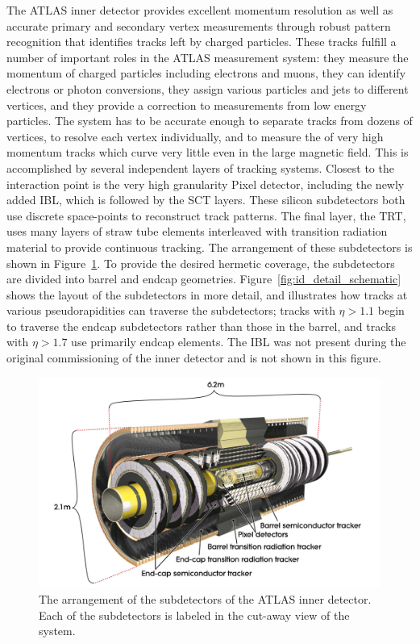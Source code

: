 The ATLAS inner detector provides excellent momentum resolution as well as accurate primary and secondary vertex measurements through robust pattern recognition that identifies tracks left by charged particles. 
These tracks fulfill a number of important roles in the ATLAS measurement system: they measure the momentum of charged particles including electrons and muons, they can identify electrons or photon conversions, they assign various particles and jets to different vertices, and they provide a correction to \met measurements from low energy particles. 
The system has to be accurate enough to separate tracks from dozens of vertices, to resolve each vertex individually, and to measure the \pt of very high momentum tracks which curve very little even in the large magnetic field.
This is accomplished by several independent layers of tracking systems.
Closest to the interaction point is the very high granularity Pixel detector, including the newly added \acl{IBL}, which is followed by the \ac{SCT} layers.
These silicon subdetectors both use discrete space-points to reconstruct track patterns.
The final layer, the \ac{TRT}, uses many layers of straw tube elements interleaved with transition radiation material to provide continuous tracking.
The arrangement of these subdetectors is shown in Figure~\ref{fig:id_overview}.
To provide the desired hermetic coverage, the subdetectors are divided into barrel and endcap geometries.
Figure~\ref{fig:id_detail_schematic} shows the layout of the subdetectors in more detail, and illustrates how tracks at various pseudorapidities can traverse the subdetectors; tracks with $\eta > 1.1$ begin to traverse the endcap subdetectors rather than those in the barrel, and tracks with $\eta > 1.7$ use primarily endcap elements. 
The \ac{IBL} was not present during the original commissioning of the inner detector and is not shown in this figure.

\begin{figure}[hbtp]
\includegraphics[width=\fullfig]{figures/id_overview.pdf}
\caption{The arrangement of the subdetectors of the ATLAS inner detector. Each of the subdetectors is labeled in the cut-away view of the system.}
\label{fig:id_overview}
\end{figure}

